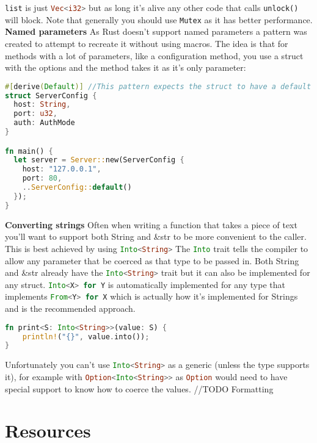 \documentclass[a4paper,11pt]{article}
\begin{document}
\lstinline{list} is just \lstinline[language=Rust]{Vec<i32>} but as long it's alive any other code that calls \lstinline[language=Rust]{unlock()} will block.
\newline
Note that generally you should use \lstinline[language=Rust]{Mutex} as it has better performance.
\medskip
\textbf{Named parameters}
\newline
As Rust doesn't support named parameters a pattern was created to attempt to recreate it without using macros.
\newline
The idea is that for methods with a lot of parameters, like a configuration method, you use a struct with the options and the method takes it as it's only parameter:
 \begin{lstlisting}[language=Rust,frame=single]
#[derive(Default)] //This pattern expects the struct to have a default version
struct ServerConfig {
  host: String, 
  port: u32,
  auth: AuthMode
}

fn main() {
  let server = Server::new(ServerConfig {
    host: "127.0.0.1",
    port: 80,
    ..ServerConfig::default()
  });
}
\end{lstlisting}
\medskip
\textbf{Converting strings}
\newline
Often when writing a function that takes a piece of text you'll want to support both String and \&str to be more convenient to the caller. This is best achieved by using \lstinline[language=Rust]{Into<String>}
The \lstinline[language=Rust]{Into} trait tells the compiler to allow any parameter that be coerced as that type to be passed in. Both String and \&str already have the \lstinline[language=Rust]{Into<String>} trait but it can also be implemented for any struct. \lstinline[language=Rust]{Into<X> for Y} is automatically implemented for any type that implements \lstinline[language=Rust]{From<Y> for X} which is actually how it's implemented for Strings and is the recommended approach.
\begin{lstlisting}[language=Rust,frame=single]
fn print<S: Into<String>>(value: S) {
    println!("{}", value.into());
}
\end{lstlisting}
Unfortunately you can't use \lstinline[language=Rust]{Into<String>} as a generic (unless the type supports it), for example with \lstinline[language=Rust]{Option<Into<String>>} as \lstinline[language=Rust]{Option} would need to have special support to know how to coerce the values.
//TODO Formatting

\newpage
\section{Resources}
\end{document}
